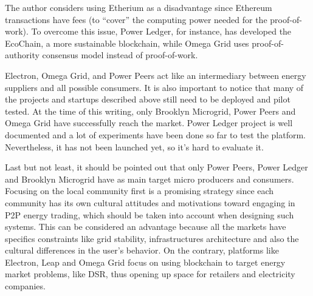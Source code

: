 The author considers using Etherium as a disadvantage since Ethereum transactions have fees (to “cover” the computing power needed for the proof-of-work). To overcome this issue, Power Ledger, for instance, has developed the EcoChain, a more sustainable blockchain, while Omega Grid uses proof-of-authority consensus model instead of proof-of-work.



Electron, Omega Grid, and Power Peers act like an intermediary between energy suppliers and all possible consumers. It is also important to notice that many of the projects and startups described above still need to be deployed and pilot tested. At the time of this writing, only Brooklyn Microgrid, Power Peers and Omega Grid have successfully reach the market. Power Ledger project is well documented and a lot of experiments have been done so far to test the platform. Nevertheless, it has not been launched yet, so it’s hard to evaluate it.



Last but not least, it should be pointed out that only Power Peers, Power Ledger and Brooklyn Microgrid have as main target micro producers and consumers. Focusing on the local community first is a promising strategy since each community has its own cultural attitudes and motivations toward engaging in P2P energy trading, which should be taken into account when designing such systems. This can be considered an advantage because all the markets have specifics constraints like grid stability, infrastructures architecture and also the cultural differences in the user’s behavior. On the contrary, platforms like Electron, Leap and Omega Grid focus on using blockchain to target energy market problems, like \ac{DSR}, thus opening up space for retailers and electricity companies.   
